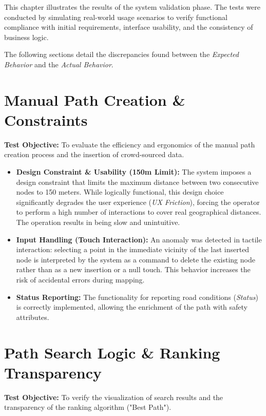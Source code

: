 This chapter illustrates the results of the system validation phase. The tests were conducted by simulating real-world usage scenarios to verify functional compliance with initial requirements, interface usability, and the consistency of business logic.

The following sections detail the discrepancies found between the \textit{Expected Behavior} and the \textit{Actual Behavior}.

\section{Manual Path Creation \& Constraints}
\textbf{Test Objective:} To evaluate the efficiency and ergonomics of the manual path creation process and the insertion of crowd-sourced data.

\begin{itemize}
    \item \textbf{Design Constraint \& Usability (150m Limit):} The system imposes a design constraint that limits the maximum distance between two consecutive nodes to 150 meters. While logically functional, this design choice significantly degrades the user experience (\textit{UX Friction}), forcing the operator to perform a high number of interactions to cover real geographical distances. The operation results in being slow and unintuitive.
    \item \textbf{Input Handling (Touch Interaction):} An anomaly was detected in tactile interaction: selecting a point in the immediate vicinity of the last inserted node is interpreted by the system as a command to delete the existing node rather than as a new insertion or a null touch. This behavior increases the risk of accidental errors during mapping.
    \item \textbf{Status Reporting:} The functionality for reporting road conditions (\textit{Status}) is correctly implemented, allowing the enrichment of the path with safety attributes.
\end{itemize}

\section{Path Search Logic \& Ranking Transparency}
\textbf{Test Objective:} To verify the visualization of search results and the transparency of the ranking algorithm ("Best Path").

